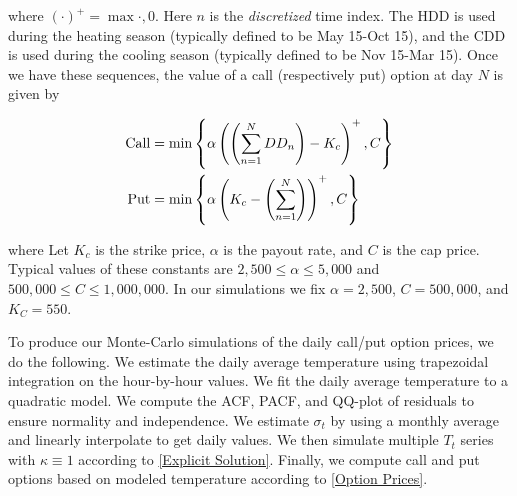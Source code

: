 \documentclass{article}
\begin{document}
	where $(\cdot)^+ = \max{\cdot, 0}$. Here $n$ is the \textit{discretized} time index. The HDD is used during the heating season (typically defined to be May 15-Oct 15), and the CDD is used during the cooling season (typically defined to be Nov 15-Mar 15). Once we have these sequences, the value of a call (respectively put) option at day $N$ is given by 
	
	\begin{equation} \label{Option Prices}
		\begin{split}
			\text{Call} &= \min \left \lbrace \alpha \left( \left(\sum_{n=1}^N DD_n \right) - K_c \right)^+, C \right \rbrace
			\\
			\text{Put} &= \min \left \lbrace \alpha \left(K_c - \left(\sum_{n=1}^N \right)   \right)^+, C \right \rbrace
		\end{split}
	\end{equation}
	
	where Let $K_c$ is the strike price, $\alpha$ is the payout rate, and $C$ is the cap price. Typical values of these constants are $2,500 \leq \alpha \leq 5,000$ and $500,000 \leq C \leq 1,000,000$. In our simulations we fix $\alpha = 2,500$, $C = 500,000$, and $K_C = 550$. 
	
	To produce our Monte-Carlo simulations of the daily call/put option prices, we do the following. We estimate the daily average temperature using trapezoidal integration on the hour-by-hour values. We fit the daily average temperature to a quadratic model. We compute the ACF, PACF, and QQ-plot of residuals to ensure normality and independence. We estimate $\sigma_t$ by using a monthly average and linearly interpolate to get daily values. We then simulate multiple $T_t$ series with $\kappa \equiv 1$ according to \eqref{Explicit Solution}. Finally, we compute call and put options based on modeled temperature according to \eqref{Option Prices}.
	
	\printbibliography
\end{document}

